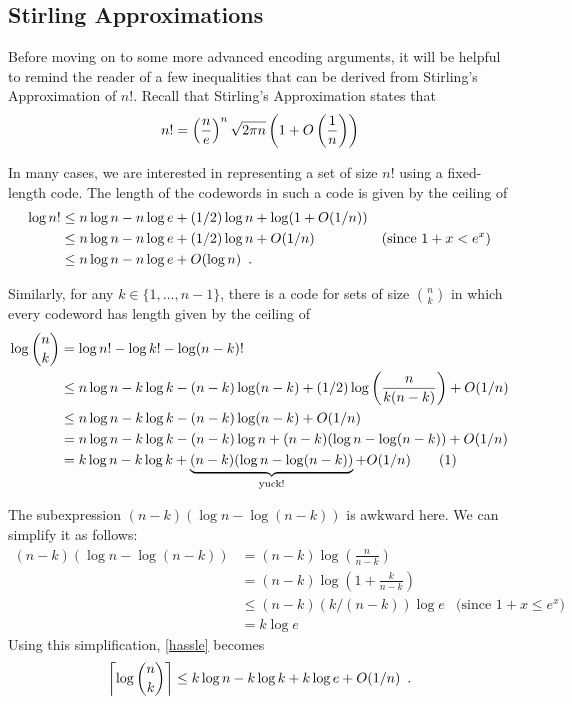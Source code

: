 \documentclass[lotsofwhite]{patmorin}
\newcommand\numberthis{\addtocounter{equation}{1}\tag{\theequation}}
\begin{document}
\subsection{Stirling Approximations}

Before moving on to some more advanced encoding arguments, it will
be helpful to remind the reader of a few inequalities that can be
derived from Stirling's Approximation of $n!$.  Recall that Stirling's
Approximation states that
\begin{equation}
  n! = \left(\frac{n}{e}\right)^n\sqrt{2\pi n}\left(1+O\left(\frac{1}{n}\right)\right) 
   \eqlabel{stirling}
\end{equation}

In many cases, we are interested in representing a set of size $n!$
using a fixed-length code.  The length of the codewords in such a code
is given by the ceiling of
\begin{align}
  \log n!
      & \le n\log n - n\log e + (1/2)\log n + \log(1+O(1/n)) \notag \\
      & \le n\log n - n\log e + (1/2)\log n + O(1/n)  
             & \text{(since $1+x < e^x$)}
               \eqlabel{stirling-tight} \\
      & \le n\log n - n\log e + O(\log n)  
             \eqlabel{stirling-loose} \enspace .
\end{align}

Similarly, for any $k\in\{1,\ldots,n-1\}$, there is a code for sets of 
size $\binom{n}{k}$ in which every codeword has length given by the ceiling of
\begin{align*}
  \log \binom{n}{k}
     & = \log n! - \log k! - \log (n-k)! \\
     & \le n\log n - k\log k - (n-k)\log(n-k) + (1/2)\log\left(\frac{n}{k(n-k)}\right) + O(1/n) \\
     & \le n\log n - k\log k - (n-k)\log(n-k) + O(1/n) \\
     & = n\log n - k\log k - (n-k)\log n + (n-k)(\log n-\log(n-k)) + O(1/n) \\
     & = k\log n - k\log k + \underbrace{(n-k)(\log n-\log(n-k))}_\text{yuck!}  + O(1/n) 
         \numberthis \eqlabel{hassle} \\ 
\end{align*}

The subexpression $(n-k)(\log n-\log(n-k))$ is awkward here. We can
simplify it as follows:
\begin{align*}
   (n-k)(\log n-\log(n-k))
      & = (n-k)\log \left(\frac{n}{n-k}\right) \\
      & = (n-k)\log \left(1+\frac{k}{n-k}\right) \\
      & \le (n-k)(k/(n-k))\log e & \text{(since $1+x \le e^x$)} \\
      & = k\log e 
\end{align*}
Using this simplification, \eqref{hassle} becomes
\begin{equation}
  \left\lceil\log \binom{n}{k}\right\rceil 
    \le k\log n - k\log k + k\log e + O(1/n) \eqlabel{log-n-choose-k}
     \enspace .
\end{equation} 
\end{document}
